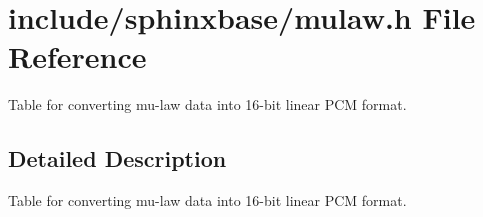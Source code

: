 \section{include/sphinxbase/mulaw.h File Reference}
\label{mulaw_8h}


Table for converting mu-\/law data into 16-\/bit linear P\+CM format.  




\subsection{Detailed Description}
Table for converting mu-\/law data into 16-\/bit linear P\+CM format. 

